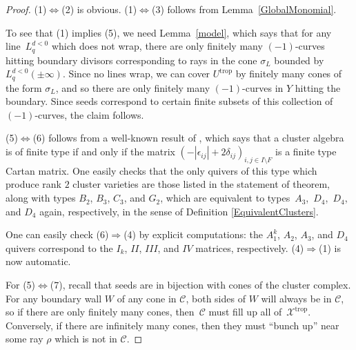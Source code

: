 \documentclass[pdftex]{sigma}
\numberwithin{equation}{section}
\numberwithin{figure}{section}
\numberwithin{table}{section}
\DeclareMathOperator{\trop}{trop}
\let\s=\mathcal
\theoremstyle{definition}
\begin{document}
\begin{proof}(1)$\Leftrightarrow$(2) is obvious. (1)$\Leftrightarrow$(3) follows from Lemma~\ref{GlobalMonomial}.

To see that (1) implies (5), we need Lemma~\ref{model}, which says that for any line~$L_q^{d<0}$ which does not wrap, there are only finitely many $(-1)$-curves hitting boundary divisors corresponding to rays in the cone $\sigma_{L}$ bounded by $L_q^{d<0}(\pm \infty)$. Since no lines wrap, we can cover $U^{\trop}$ by finitely many cones of the form $\sigma_{L}$, and so there are only finitely many $(-1)$-curves in $Y$ hitting the boundary. Since seeds correspond to certain finite subsets of this collection of $(-1)$-curves, the claim follows.

(5)$\Leftrightarrow$(6) follows from a well-known result of \cite{FZ2}, which says that a cluster algebra is of finite type if and only if the matrix $(-|\epsilon_{ij}|+2\delta_{ij})_{i,j\in I\setminus F}$ is a finite type Cartan matrix. One easily checks that the only quivers of this type which produce rank $2$ cluster varieties are those listed in the statement of theorem, along with types $B_2$, $B_3$, $C_3$, and $G_2$, which are equivalent to types~$A_3$,~$D_4$,~$D_4$, and $D_4$ again, respectively, in the sense of Definition \ref{EquivalentClusters}.

 One can easily check (6)$\Rightarrow$(4) by explicit computations: the $A_1^k$, $A_2$, $A_3$, and $D_4$ quivers correspond to the $I_k$, $II$, $III$, and $IV$ matrices, respectively. (4)$\Rightarrow$(1) is now automatic.

For (5)$\Leftrightarrow$(7), recall that seeds are in bijection with cones of the cluster complex. For any boundary wall $W$ of any cone in $\s{C}$, both sides of $W$ will always be in $\s{C}$, so if there are only finitely many cones, then~$\s{C}$ must fill up all of~$\s{X}^{\trop}$. Conversely, if there are infinitely many cones, then they must ``bunch up'' near some ray $\rho$ which is not in $\s{C}$.
\end{proof}
\end{document}
